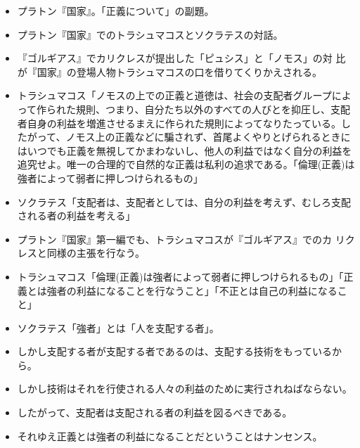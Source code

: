 \documentclass[uplatex]{bxjsarticle}
\begin{document}
\begin{itemize}

\item プラトン『国家』。「正義について」の副題。

 \item プラトン『国家』でのトラシュマコスとソクラテスの対話。

\item 『ゴルギアス』でカリクレスが提出した「ピュシス」と「ノモス」の対
  比が『国家』の登場人物トラシュマコスの口を借りてくりかえされる。

\item トラシュマコス「ノモスの上での正義と道徳は、社会の支配者グループによって作られた規則、つまり、自分たち以外のすべての人びとを抑圧し、支配者自身の利益を増進させるまえに作られた規則によってなりたっている。したがって、ノモス上の正義などに騙されず、首尾よくやりとげられるときにはいつでも正義を無視してかまわないし、他人の利益ではなく自分の利益を追究せよ。唯一の合理的で自然的な正義は私利の追求である。「倫理(正義)は強者によって弱者に押しつけられるもの」

\item ソクラテス「支配者は、支配者としては、自分の利益を考えず、むしろ支配される者の利益を考える」

\item プラトン『国家』第一編でも、トラシュマコスが『ゴルギアス』でのカ
  リクレスと同様の主張を行なう。

\item トラシュマコス「倫理(正義)は強者によって弱者に押しつけられるもの」「正義とは強者の利益になることを行なうこと」「不正とは自己の利益になること」

\item ソクラテス「強者」とは「人を支配する者」。


\item しかし支配する者が支配する者であるのは、支配する技術をもっているから。


\item しかし技術はそれを行使される人々の利益のために実行されねばならない。

\item したがって、支配者は支配される者の利益を図るべきである。

\item それゆえ正義とは強者の利益になることだということはナンセンス。


\end{itemize}
\end{document}

